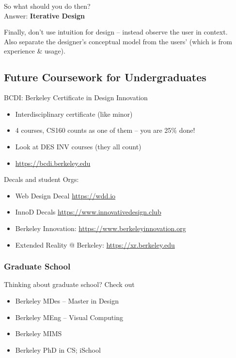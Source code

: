 \hrulefill

So what should you do then?\\
Answer: \textbf{Iterative Design}

Finally, don't use intuition for design -- instead observe the user in context. \\
Also separate the designer's conceptual model from the users' (which is from experience \& usage).

\subsection{Future Coursework for Undergraduates}
BCDI: Berkeley Certificate in Design Innovation
\begin{itemize}
    \item Interdisciplinary certificate (like minor)
    \item 4 courses, CS160 counts as one of them -- you are 25\% done!
    \item Look at DES INV courses (they all count)
    \item \href{https://bcdi.berkeley.edu}{https://bcdi.berkeley.edu}
\end{itemize}

Decals and student Orgs:
\begin{itemize}
    \item Web Design Decal \href{https://wdd.io}{https://wdd.io}
    \item InnoD Decals \href{https://www.innovativedesign.club}{https://www.innovativedesign.club}
    \item Berkeley Innovation: \href{https://www.berkeleyinnovation.org}{https://www.berkeleyinnovation.org}
    \item Extended Reality @ Berkeley: \href{https://xr.berkeley.edu}{https://xr.berkeley.edu}
\end{itemize}

\subsubsection{Graduate School}
Thinking about graduate school? Check out
\begin{itemize}
    \item Berkeley MDes – Master in Design
    \item Berkeley MEng – Visual Computing
    \item Berkeley MIMS
    \item Berkeley PhD in CS; iSchool
\end{itemize}

